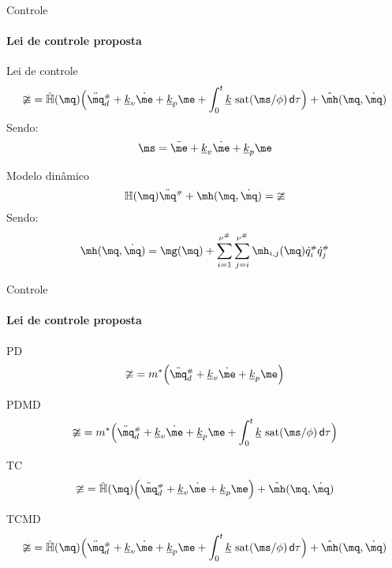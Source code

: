 \documentclass[25pt,landscape]{beamer}
\begin{document}
\begin{frame}{Controle}
    \framesubtitle{Lei de controle proposta}
    \pause
    \begin{block}{Lei de controle}
    	$$ \mup = \hat{\mH}(\mq) \Big( \ddot{\mq}\ssh_d + \underline{k}_v\dot{\me} + \underline{k}_p\me + \int_0^t \underline{k} \, \sat(\ms/\phi) \,\dd \tau \Big) +  \hat{\mh}(\mq, \dot{\mq}) $$
    	Sendo:
    	$$ \ms = \ddot{\me} + \underline{k}_v\dot{\me} + \underline{k}_p\me $$
    \end{block}
    \pause
    \begin{block}{Modelo din\^amico}
    	$$ \mH(\mq)  \ddot{\mq}\ssh + \mh(\mq,\dot{\mq}) = \mup $$
    	Sendo:
    	$$ \mh(\mq,\dot{\mq}) = \mg(\mq) + \sum_{i=1}^{\nu\ssh} \sum_{j=i}^{\nu\ssh} \mh_{i,j}(\mq) \dot{q}\ssh_i \dot{q}\ssh_j $$
    \end{block}
\end{frame}

\begin{frame}{Controle}
    \framesubtitle{Lei de controle proposta}
    \pause
    \begin{block}{PD}
    	$$ \mup = m^* \Big( \ddot{\mq}\ssh_d + \underline{k}_v\dot{\me} + \underline{k}_p\me \Big)$$
    \end{block}
     \pause
    \begin{block}{PDMD}
    	$$ \mup = m^* \Big( \ddot{\mq}\ssh_d + \underline{k}_v\dot{\me} + \underline{k}_p\me + \int_0^t \underline{k} \, \sat(\ms/\phi) \,\dd \tau \Big) $$
    \end{block}
     \pause
    \begin{block}{TC}
    	$$ \mup = \hat{\mH}(\mq) \Big( \ddot{\mq}\ssh_d + \underline{k}_v\dot{\me} + \underline{k}_p\me \Big) +  \hat{\mh}(\mq, \dot{\mq}) $$
    \end{block}
     \pause
    \begin{block}{TCMD}
    	$$ \mup = \hat{\mH}(\mq) \Big( \ddot{\mq}\ssh_d + \underline{k}_v\dot{\me} + \underline{k}_p\me + \int_0^t \underline{k} \, \sat(\ms/\phi) \,\dd \tau \Big) +  \hat{\mh}(\mq, \dot{\mq}) $$
    \end{block}
\end{frame}
\end{document}
